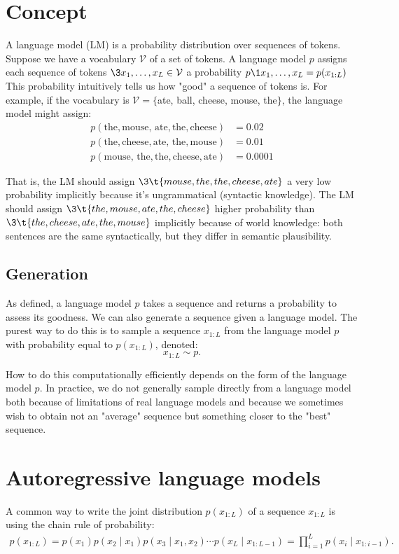 \section{Concept}
A language model (LM) is a probability distribution over sequences of tokens. Suppose we have a vocabulary $\mathcal{V}$ of a set of tokens. A language model $p$ assigns each sequence of tokens $\3{x_1, \ldots, x_L} \in \mathcal{V}$ a probability
$
p\1{x_1, \ldots, x_L} = p(x_{1:L})
$
This probability intuitively tells us how "good" a sequence of tokens is. For example, if the vocabulary is $\mathcal{V}=\{$ate, ball, cheese, mouse, the$\}$, the language model might assign:
\begin{align*}
p(\text {the}, \text {mouse, ate}, \text {the}, \text {cheese})&=0.02 \\
p(\text {the}, \text {cheese}, \text {ate, the}, \text {mouse})&=0.01 \\
p(\text {mouse, the}, \text {the}, \text {cheese}, \text {ate})&=0.0001
\end{align*}

That is, the LM should assign $\3{\t{mouse, the, the, cheese, ate}}$ a very low probability implicitly because it's ungrammatical (syntactic knowledge). The LM should assign $\3{\t{the, mouse, ate, the, cheese}}$ higher probability than $\3{\t{the, cheese, ate, the, mouse}}$ implicitly because of world knowledge: both sentences are the same syntactically, but they differ in semantic plausibility.

\subsection{Generation} 
As defined, a language model $p$ takes a sequence and returns a probability to assess its goodness. We can also generate a sequence given a language model. The purest way to do this is to sample a sequence $x_{1: L}$ from the language model $p$ with probability equal to $p\left(x_{1: L}\right)$, denoted:
$$
x_{1: L} \sim p .
$$

How to do this computationally efficiently depends on the form of the language model $p$. In practice, we do not generally sample directly from a language model both because of limitations of real language models and because we sometimes wish to obtain not an "average" sequence but something closer to the "best" sequence.

\section{Autoregressive language models}
A common way to write the joint distribution $p\left(x_{1: L}\right)$ of a sequence $x_{1: L}$ is using the chain rule of probability:
\begin{align*}
p\left(x_{1: L}\right)=p\left(x_1\right) p\left(x_2 \mid x_1\right) p\left(x_3 \mid x_1, x_2\right) \cdots p\left(x_L \mid x_{1: L-1}\right)=\prod_{i=1}^L p\left(x_i \mid x_{1: i-1}\right) .
\end{align*}

